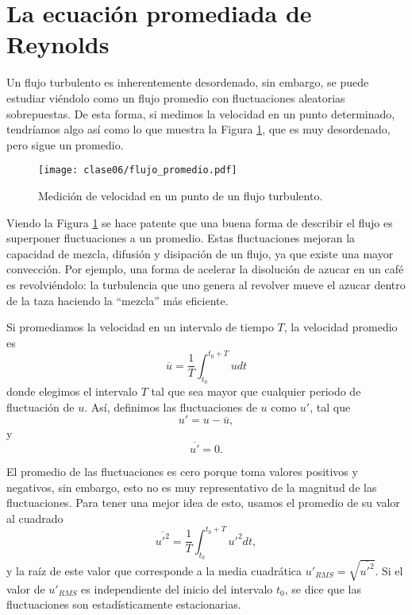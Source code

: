 \section*{La ecuación promediada de Reynolds}

Un flujo turbulento es inherentemente desordenado, sin embargo, se puede estudiar viéndolo como un flujo promedio con fluctuaciones aleatorias sobrepuestas.
De esta forma, si medimos la velocidad en un punto determinado, tendríamos algo así como lo que muestra la Figura \ref{fig:flujo_promedio}, que es muy desordenado, pero sigue un promedio.

\begin{figure}[h!]
\centering
\texttt{[image: clase06/flujo\_promedio.pdf]}
\caption{Medición de velocidad en un punto de un flujo turbulento.}
\label{fig:flujo_promedio}
\end{figure}

Viendo la Figura \ref{fig:flujo_promedio} se hace patente que una buena forma de describir el flujo es superponer fluctuaciones a un promedio.
Estas fluctuaciones mejoran la capacidad de mezcla, difusión y disipación de un flujo, ya que existe una mayor convección.
Por ejemplo, una forma de acelerar la disolución de azucar en un café es revolviéndolo: la turbulencia que uno genera al revolver mueve el azucar dentro de la taza haciendo la ``mezcla'' más eficiente.

Si promediamos la velocidad en un intervalo de tiempo $T$, la velocidad promedio es
%
\begin{equation}
\overline{u} = \frac{1}{T}\int_{t_0}^{t_0+T}udt
\end{equation}
%
donde elegimos el intervalo $T$ tal que sea mayor que cualquier periodo de fluctuación de $u$.
Así, definimos las fluctuaciones de $u$ como $u'$, tal que 
%
\begin{equation} \label{eq:fluctuacion}
u'=u-\overline{u},
\end{equation}
%
y
\begin{equation}
\overline{u'} = 0.
\end{equation}

El promedio de las fluctuaciones es cero porque toma valores positivos y negativos, sin embargo, esto no es muy representativo de la magnitud de las fluctuaciones. 
Para tener una mejor idea de esto, usamos el promedio de su valor al cuadrado
%
\begin{equation}
\overline{u'^2} = \frac{1}{T}\int_{t_0}^{t_0+T} u'^2dt,
\end{equation}
%
y la raíz de este valor que corresponde a la media cuadrática $u'_{RMS} = \sqrt{\overline{u'^2}}$.
Si el valor de $u'_{RMS}$ es independiente del inicio del intervalo $t_0$, se dice que las fluctuaciones son estadísticamente estacionarias.

